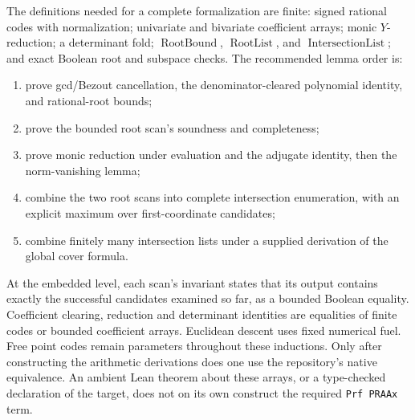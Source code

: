 The definitions needed for a complete formalization are finite:
signed rational codes with normalization; univariate and bivariate
coefficient arrays; monic \(Y\)-reduction; a determinant fold;
\(\operatorname{RootBound}\), \(\operatorname{RootList}\), and
\(\operatorname{IntersectionList}\); and exact Boolean root and
subspace checks.  The recommended lemma order is:
\begin{enumerate}
\item prove gcd/Bezout cancellation, the denominator-cleared
polynomial identity, and rational-root bounds;
\item prove the bounded root scan's soundness and completeness;
\item prove monic reduction under evaluation and the adjugate
identity, then the norm-vanishing lemma;
\item combine the two root scans into complete intersection
enumeration, with an explicit maximum over first-coordinate candidates;
\item combine finitely many intersection lists under a supplied
derivation of the global cover formula.
\end{enumerate}
At the embedded level, each scan's invariant states that its output
contains exactly the successful candidates examined so far, as a
bounded Boolean equality.  Coefficient clearing, reduction and
determinant identities are equalities of finite codes or bounded
coefficient arrays.  Euclidean descent uses fixed numerical fuel.
Free point codes remain parameters throughout these inductions.
Only after constructing the arithmetic derivations does one use
the repository's native equivalence.  An ambient Lean theorem
about these arrays, or a type-checked declaration of the target,
does not on its own construct the required \texttt{Prf PRAAx} term.
